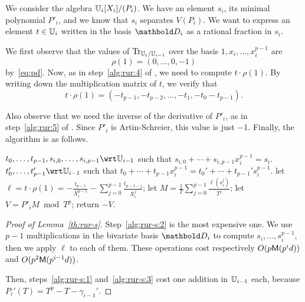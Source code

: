 We consider the algebra $\mathbb{U}_i[X_i]/(P_i)$. We have an element $s_i$,
its minimal polynomial $P'_i$, and we know that $s_i$ separates
$V(P_i)$. We want to express an element $t\in\mathbb{U}_i$ written in the
basis $\basis{D}_i$ as a rational fraction in $s_i$.

We first observe that the values of $\operatorname{Tr}_{\mathbb{U}_i/\mathbb{U}_{i-1}}$ over the
basis $1,x_i,\ldots,x_i^{p-1}$ are 
\begin{equation}
  \label{eq:110}
  \rho(1) = (0,\ldots,0,-1)
\end{equation}
by~\eqref{eq:pd}. Now, as in step~\ref{alg:rur:4} of
, we need to compute $t\cdot\rho(1)$. By
writing down the multiplication matrix of $t$, we verify that
\begin{equation}
  \label{eq:111}
  t\cdot\rho(1) = (-t_{p-1}, -t_{p-2}, \ldots, -t_1, -t_0-t_{p-1})
  \text{.}
\end{equation}

Also observe that we need the inverse of the derivative of $P'_i$, as
in step~\ref{alg:rur:5} of . Since $P'_i$ is Artin-Schreier,
this value is just $-1$. Finally, the algorithm
 is as follows.

\begin{algorithm}
  \caption{$_{\lst{s}_i}$}
  \label{alg:RUR-si}
  \begin{algorithmic}[1]
    \REQUIRE $t_0,\ldots,t_{p-1},s_{i,0},\ldots,s_{i,p-1}\wrt\U_{i-1}$ such that $s_{i,0}+\cdots+s_{i,p-1}x_i^{p-1}=s_i$.
    \ENSURE $t_0',\ldots,t_{p-1}'\wrt\U_{i-1}$ such that $t_0+\cdots+t_{p-1}x_i^{p-1}=t_0'+\cdots+t_{p-1}'s_i^{p-1}$.
    \STATE \label{alg:rur-s:1}let $\ell = t\cdot\rho(1) =  -\frac{t_{p-1}}{X_i^{p-1}} - \sum_{j=0}^{p-1} \frac{t_{p-1-j}}{X_i^j}$;
    \STATE \label{alg:rur-s:2}let $M = \frac{1}{T}\sum_{j=0}^{p-1}\frac{\ell(s_i^j)}{T^j}$;
    \STATE \label{alg:rur-s:3}let $V = P'_iM \bmod T^p$;
    \STATE return $-V$.
  \end{algorithmic}
\end{algorithm}

\begin{proof}[Proof of Lemma~\ref{th:rur-s}]
  Step~\ref{alg:rur-s:2} is the most expensive one. We use $p-1$
  multiplications in the bivariate basis $\basis{D}_i$ to compute
  $s_i,\ldots,s_i^{p-1}$, then we apply $\ell$ to each of them. These
  operations cost respectively $O(p\mathsf{M}(p^id))$ and
  $O(p^2\mathsf{M}(p^{i-1}d))$.

  Then, steps~\ref{alg:rur-s:1} and~\ref{alg:rur-s:3} cost one
  addition in $\mathbb{U}_{i-1}$ each, because $P_i'(T)=T^p-T-\gamma_{i-1}'$.
\end{proof}

